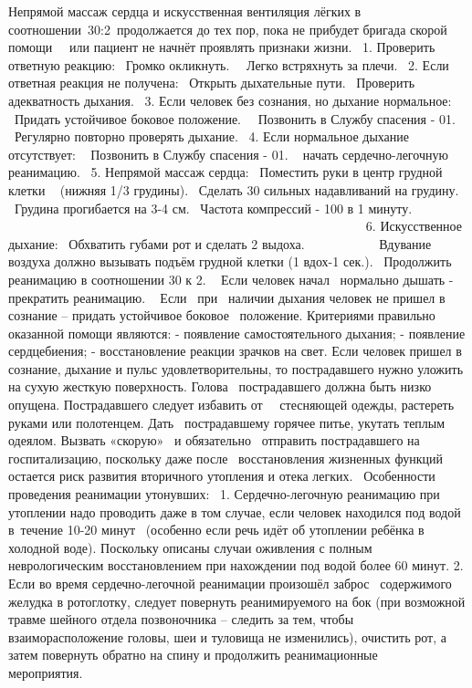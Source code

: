 \documentclass[a4paper, 12pt]{article}
\theoremstyle{definition}
\begin{document}
        Непрямой массаж сердца и искусственная вентиляция лёгких в соотношении 30:2 продолжается до тех пор, пока не прибудет бригада скорой помощи   или пациент не начнёт проявлять признаки жизни.
         1. Проверить ответную реакцию:
         Громко окликнуть. 
         Легко встряхнуть за плечи.
         2. Если ответная реакция не получена:
         Открыть дыхательные пути.
         Проверить адекватность дыхания.
         3. Если человек без сознания, но дыхание нормальное:
         Придать устойчивое боковое положение. 
         Позвонить в Службу спасения - 01.
         Регулярно повторно проверять дыхание.
         4. Если нормальное дыхание отсутствует:
          Позвонить в Службу спасения - 01.
          начать сердечно-легочную реанимацию.
         5. Непрямой массаж сердца:
         Поместить руки в центр грудной клетки   (нижняя 1/3 грудины).
         Сделать 30 сильных надавливаний на грудину.
         Грудина прогибается на 3-4 см.
         Частота компрессий - 100 в 1 минуту.
                                                                                    
        6. Искусственное дыхание:
         Обхватить губами рот и сделать 2 выдоха.            
         Вдувание воздуха должно вызывать подъём грудной клетки (1 вдох-1 сек.).
         Продолжить реанимацию в соотношении 30 к 2.
          Если человек начал  нормально дышать - прекратить реанимацию.
          Если  при  наличии дыхания человек не пришел в сознание – придать устойчивое боковое  положение.
        Критериями правильно оказанной помощи яв­ляются:
        - появление самостоятельного дыхания;
        - появление сердцебиения;
        - восстановление реакции зрачков на свет.
        Если человек пришел в сознание, дыхание и пульс удовлетворительны, то пострадавшего нужно уложить на сухую жесткую поверхность. Голова  пострадавшего должна быть низко опущена. Пострадавшего следует избавить от   стесняющей одежды, растереть руками или полотенцем. Дать  пострадавшему горячее питье, укутать теплым одеялом. Вызвать «скорую»  и обязательно  отправить пострадавшего на госпитализацию, поскольку даже после  восстановления жизненных функций остается риск развития вторичного утопления и отека легких.
         Особенности проведения реанимации утонувших:
         1. Сердечно-легочную реанимацию при утоплении надо проводить даже в том случае, если человек находился под водой в течение 10-20 минут  (особенно если речь идёт об утоплении ребёнка в холодной воде). Поскольку описаны случаи оживления с полным неврологическим восстановлением при нахождении под водой более 60 минут.
        2. Если во время сердечно-легочной реанимации произошёл заброс  содержимого желудка в ротоглотку, следует повернуть реанимируемого на бок (при возможной травме шейного отдела позвоночника – следить за тем, чтобы взаиморасположение головы, шеи и туловища не изменились), очистить рот, а затем повернуть обратно на спину и продолжить реанимационные         мероприятия.
\end{document}
